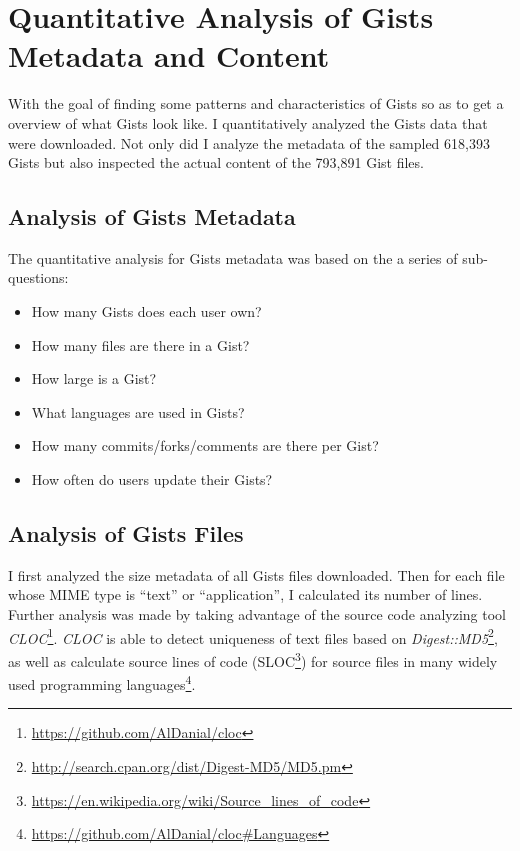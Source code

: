 \section{Quantitative Analysis of Gists Metadata and Content}

With the goal of finding some patterns and characteristics of Gists so as to get a overview of what Gists look like. I quantitatively analyzed the Gists data that were downloaded. Not only did I analyze the metadata of the sampled 618,393 Gists but also inspected the actual content of the 793,891 Gist files.

\subsection{Analysis of Gists Metadata}

The quantitative analysis for Gists metadata was based on the a series of sub-questions:
\begin{itemize}
	\item How many Gists does each user own?

	\item How many files are there in a Gist?

	\item How large is a Gist?

	\item What languages are used in Gists?

	\item How many commits/forks/comments are there per Gist?

	\item How often do users update their Gists?
\end{itemize}

\subsection{Analysis of Gists Files}

I first analyzed the size metadata of all Gists files downloaded. Then for each file whose MIME type is ``text'' or ``application'',  I calculated its number of lines. Further analysis was made by taking advantage of the source code analyzing tool \textit{CLOC}\footnote{\url{https://github.com/AlDanial/cloc}}. \textit{CLOC} is able to detect uniqueness of text files based on \textit{Digest::MD5}\footnote{\url{http://search.cpan.org/dist/Digest-MD5/MD5.pm}}, as well as calculate source lines of code (SLOC\footnote{\url{https://en.wikipedia.org/wiki/Source_lines_of_code}}) for source files in many widely used programming languages\footnote{\url{https://github.com/AlDanial/cloc\#Languages}}. 